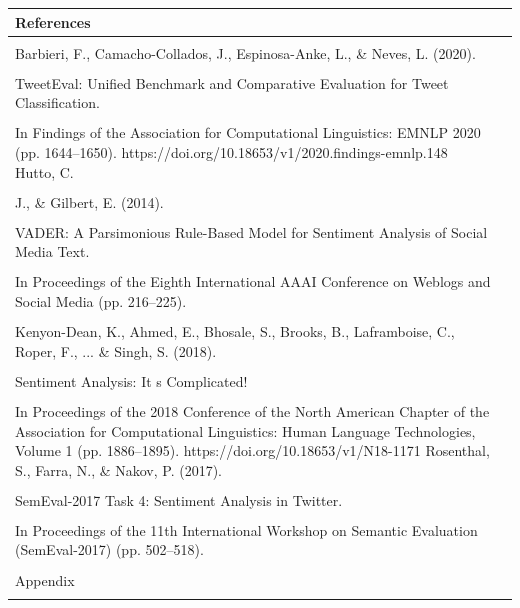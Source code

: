 \documentclass[11pt]{article}
\begin{document}
\begin{longtable}{|p{}|p{}|}
\hline
References & \\[2pt]
\hline
\rule{0pt}{3.5cm} & \\
\hline
Barbieri, F., Camacho-Collados, J., Espinosa-Anke, L., \& Neves, L. (2020). & \\[2pt]
\hline
\rule{0pt}{3.5cm} & \\
\hline
TweetEval: Unified Benchmark and Comparative Evaluation for Tweet Classification. & \\[2pt]
\hline
\rule{0pt}{3.5cm} & \\
\hline
In Findings of the Association for Computational Linguistics: EMNLP 2020 (pp. 1644--1650). https://doi.org/10.18653/v1/2020.findings-emnlp.148 Hutto, C. & \\[2pt]
\hline
\rule{0pt}{3.5cm} & \\
\hline
J., \& Gilbert, E. (2014). & \\[2pt]
\hline
\rule{0pt}{3.5cm} & \\
\hline
VADER: A Parsimonious Rule-Based Model for Sentiment Analysis of Social Media Text. & \\[2pt]
\hline
\rule{0pt}{3.5cm} & \\
\hline
In Proceedings of the Eighth International AAAI Conference on Weblogs and Social Media (pp. 216--225). & \\[2pt]
\hline
\rule{0pt}{3.5cm} & \\
\hline
Kenyon-Dean, K., Ahmed, E., Bhosale, S., Brooks, B., Laframboise, C., Roper, F., ... \& Singh, S. (2018). & \\[2pt]
\hline
\rule{0pt}{3.5cm} & \\
\hline
Sentiment Analysis: It s Complicated! & \\[2pt]
\hline
\rule{0pt}{3.5cm} & \\
\hline
In Proceedings of the 2018 Conference of the North American Chapter of the Association for Computational Linguistics: Human Language Technologies, Volume 1 (pp. 1886--1895). https://doi.org/10.18653/v1/N18-1171 Rosenthal, S., Farra, N., \& Nakov, P. (2017). & \\[2pt]
\hline
\rule{0pt}{3.5cm} & \\
\hline
SemEval-2017 Task 4: Sentiment Analysis in Twitter. & \\[2pt]
\hline
\rule{0pt}{3.5cm} & \\
\hline
In Proceedings of the 11th International Workshop on Semantic Evaluation (SemEval-2017) (pp. 502--518). & \\[2pt]
\hline
\rule{0pt}{3.5cm} & \\
\hline
Appendix & \\[2pt]
\hline
\rule{0pt}{3.5cm} & \\
\hline
\end{longtable}
\end{document}
